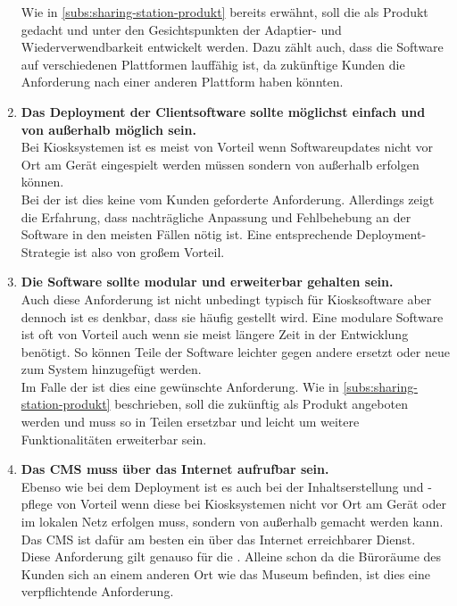 \begin{enumerate}[label=\textbf{NFA\arabic*}]
  Wie in \autoref{subs:sharing-station-produkt} bereits erwähnt, soll die \shst{} als Produkt gedacht und
  unter den Gesichtspunkten der Adaptier- und Wiederverwendbarkeit entwickelt werden. Dazu zählt auch, dass die Software
  auf verschiedenen Plattformen lauffähig ist, da zukünftige Kunden die Anforderung nach einer anderen Plattform
  haben könnten. 
  \item\label{nfa7} \textbf{Das Deployment der Clientsoftware sollte möglichst einfach und von außerhalb möglich sein.}\\
  Bei Kiosksystemen ist es meist von Vorteil wenn Softwareupdates nicht vor Ort am Gerät eingespielt werden 
  müssen sondern von außerhalb erfolgen können.\\
  Bei der \shst{} ist dies keine vom Kunden geforderte Anforderung. Allerdings zeigt die Erfahrung, dass nachträgliche
  Anpassung und Fehlbehebung an der Software in den meisten Fällen nötig ist. Eine entsprechende Deployment-Strategie
  ist also von großem Vorteil.
  \item\label{nfa8} \textbf{Die Software sollte modular und erweiterbar gehalten sein.}\\
  Auch diese Anforderung ist nicht unbedingt typisch für Kiosksoftware aber dennoch ist es denkbar,
  dass sie häufig gestellt wird. 
  Eine modulare Software ist oft von Vorteil auch wenn sie meist längere Zeit in der Entwicklung
  benötigt. So können Teile der Software leichter gegen andere ersetzt oder neue zum System hinzugefügt 
  werden.\\
  Im Falle der \shst{} ist dies eine gewünschte Anforderung. Wie in \autoref{subs:sharing-station-produkt} beschrieben,
  soll die \shst{} zukünftig als Produkt angeboten werden und muss so in Teilen ersetzbar
  und leicht um weitere Funktionalitäten erweiterbar sein. 
  \item\label{nfa9} \textbf{Das CMS muss über das Internet aufrufbar sein.}\\
  Ebenso wie bei dem Deployment ist es auch bei der Inhaltserstellung und -pflege von Vorteil wenn diese bei 
  Kiosksystemen nicht vor Ort am Gerät oder im lokalen Netz erfolgen muss, sondern von außerhalb gemacht 
  werden kann. Das CMS ist dafür am besten ein über das Internet erreichbarer Dienst.\\
  Diese Anforderung gilt genauso für die \shst{}. Alleine schon da die Büroräume des Kunden sich an einem 
  anderen Ort wie das Museum befinden, ist dies eine verpflichtende Anforderung.
\end{enumerate}
